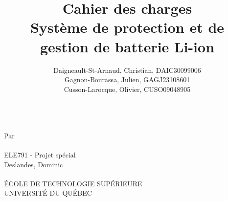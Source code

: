 
\title{
	\textbf{Cahier des charges} \\
	\vspace{2cm}
	Système de protection et de gestion de batterie Li-ion	
	}
\author{
	Daigneault-St-Arnaud, Christian, DAIC30099006 \\
	Gagnon-Bourassa, Julien, GAGJ23108601 \\
	Cusson-Larocque, Olivier, CUSO09048905	
}
\newcommand{\cours}{ELE791 - Projet spécial }
\newcommand{\prof}{Deslandes, Dominic}



\makeatletter
\begin{titlepage}

	
	\thispagestyle{empty}
	\centering
	{\Huge \@title}\\ 
	\vspace{2cm}
	{\large Par \\
		\vspace{0.5cm}
		\@author \\
		\vspace{2cm}
		\cours \\
		\vspace{0.5cm}
		\prof \\
		\vspace{3.0cm}
		\@date \\
		\vspace{3.0cm}
		\'{E}COLE DE TECHNOLOGIE SUP\'{E}RIEURE \\
		UNIVERSIT\'{E} DU QUÉBEC
	}
\end{titlepage}
\makeatother




